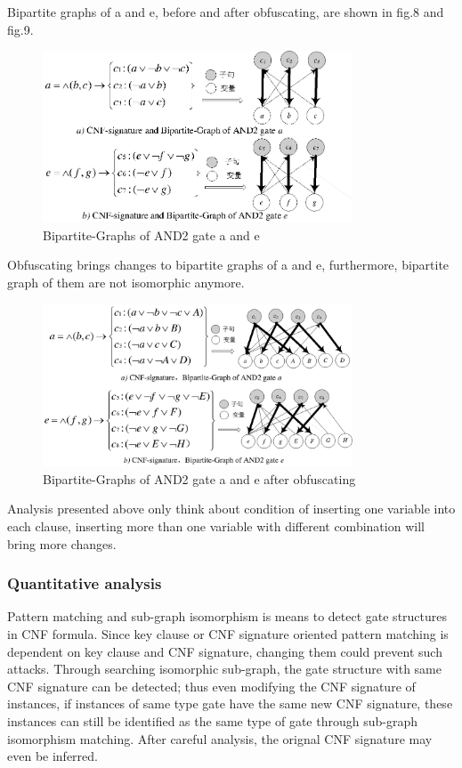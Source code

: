 \documentclass[runningheads,a4paper]{llncs}
\begin{document}
Bipartite graphs of a and e, before and after obfuscating, are shown in fig.8 and fig.9.
\begin{figure}
\centering
\includegraphics[width=9.2cm]{a8}
\caption{Bipartite-Graphs of AND2 gate a and e}
\end{figure}

Obfuscating brings changes to bipartite graphs of a and e, furthermore, bipartite graph of them are not isomorphic anymore.
\begin{figure}
\centering
\includegraphics[width=9.2cm]{a9}
\caption{Bipartite-Graphs of AND2 gate a and e after obfuscating}
\end{figure}
Analysis presented above only think about condition of inserting one variable into each clause, inserting more than one variable with different combination will bring more changes. 

\subsubsection{Quantitative analysis} 

Pattern matching and sub-graph isomorphism is means to detect gate structures in CNF formula. Since key clause or CNF signature oriented pattern matching is dependent on key clause and CNF signature, changing them could prevent such attacks. Through searching isomorphic sub-graph, the gate structure with same CNF signature can be detected; thus even modifying the CNF signature of instances, if instances of same type gate have the same new CNF signature, these instances can still be identified as the same type of gate through sub-graph isomorphism matching. After careful analysis, the orignal CNF signature may even be inferred. 
\end{document}
